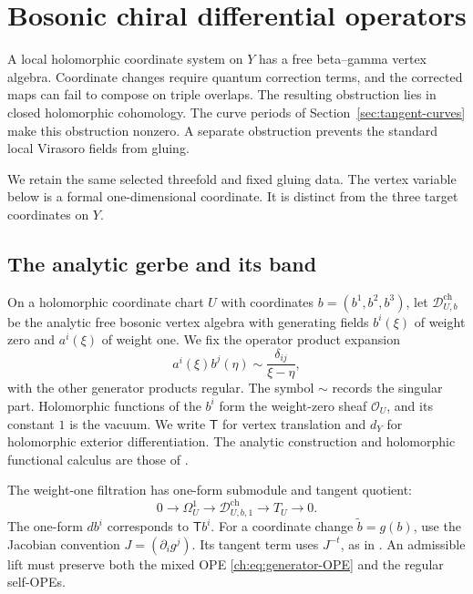 \section{Bosonic chiral differential operators}
\label{sec:chiral-operators}

A local holomorphic coordinate system on $Y$ has a free
beta--gamma vertex algebra. Coordinate changes require quantum
correction terms, and the corrected maps can fail to compose
on triple overlaps. The resulting obstruction lies in closed
holomorphic cohomology. The curve periods of
Section~\ref{sec:tangent-curves} make this obstruction nonzero.
A separate obstruction prevents the standard local Virasoro
fields from gluing.

We retain the same selected threefold and fixed gluing data.
The vertex variable below is a formal one-dimensional coordinate.
It is distinct from the three target coordinates on $Y$.

\subsection{The analytic gerbe and its band}

On a holomorphic coordinate chart $U$ with coordinates
$b=(b^1,b^2,b^3)$, let $\mathcal D^{\mathrm{ch}}_{U,b}$ be the
analytic free bosonic vertex algebra with generating fields
$b^i(\xi)$ of weight zero and $a^i(\xi)$ of weight one.
We fix the operator product expansion
\begin{equation}\label{ch:eq:generator-OPE}
       a^i(\xi)b^j(\eta)\sim\frac{\delta_{ij}}{\xi-\eta},
\end{equation}
with the other generator products regular.
The symbol $\sim$ records the singular part.
Holomorphic functions of the $b^i$ form the weight-zero sheaf
$\mathcal O_U$, and its constant $1$ is the vacuum.
We write $\mathsf T$ for vertex translation and $d_Y$ for
holomorphic exterior differentiation.
The analytic construction and holomorphic functional calculus
are those of \cite[Section~2]{GMSGerbes}.

The weight-one filtration has one-form submodule and tangent
quotient:
\[
       0\longrightarrow\Omega_U^1
       \longrightarrow\mathcal D^{\mathrm{ch}}_{U,b,1}
       \longrightarrow T_U\longrightarrow0.
\]
The one-form $db^i$ corresponds to $\mathsf T b^i$.
For a coordinate change $\widetilde b=g(b)$, use the Jacobian
convention $J=(\partial_i g^j)$.
Its tangent term uses $J^{-t}$, as in
\cite[equations~(4.4)--(4.5)]{GMSGerbes}.
An admissible lift must preserve both the mixed OPE
\eqref{ch:eq:generator-OPE} and the regular self-OPEs.

